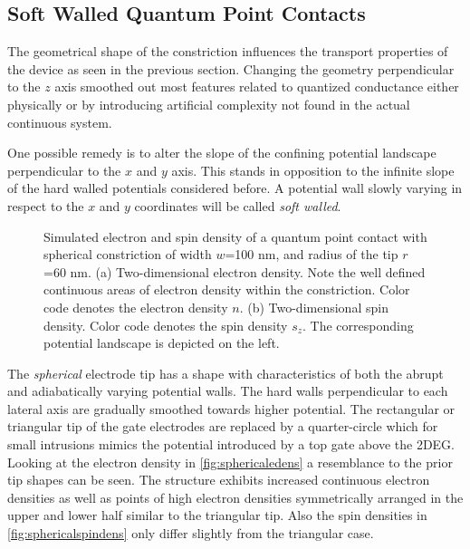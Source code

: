 \subsection{Soft Walled Quantum Point Contacts}
The geometrical shape of the constriction influences the transport properties of the device as seen in the previous section. Changing the geometry perpendicular to the $z$ axis smoothed out most features related to quantized conductance either physically or by introducing artificial complexity not found in the actual continuous system.\par
One possible remedy is to alter the slope of the confining potential landscape perpendicular to the $x$ and $y$ axis. This stands in opposition to the infinite slope of the hard walled potentials considered before. A potential wall slowly varying in respect to the $x$ and $y$ coordinates will be called \emph{soft walled}.\par
\begin{figure}[h]
\caption{Simulated electron and spin density of a quantum point contact with spherical constriction of width $w$=100 nm, and radius of the tip $r$=60 nm. (a) Two-dimensional electron density. Note the well defined continuous areas of electron density within the constriction. Color code denotes the electron density $n$. (b) Two-dimensional spin density. Color code denotes the spin density $s_z$. The corresponding potential landscape is depicted on the left.}
\end{figure}
The \emph{spherical} electrode tip has a shape with characteristics of both the abrupt and adiabatically varying potential walls. The hard walls perpendicular to each lateral axis are gradually smoothed towards higher potential. The rectangular or triangular tip of the gate electrodes are replaced by a quarter-circle which for small intrusions mimics the potential introduced by a top gate above the 2DEG. Looking at the electron density in \cref{fig:sphericaledens} a resemblance to the prior tip shapes can be seen. The structure exhibits increased continuous electron densities as well as points of high electron densities symmetrically arranged in the upper and lower half similar to the triangular tip. Also the spin densities in \cref{fig:sphericalspindens} only differ slightly from the triangular case.\par
